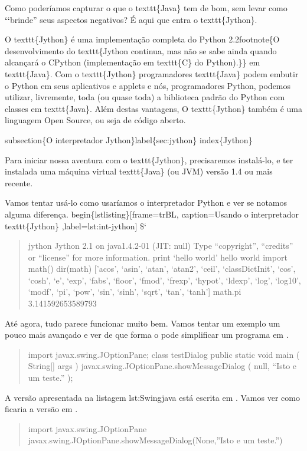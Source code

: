 \documentclass[a4paper,10pt,portuguese]{sphinxmanual}
\begin{document}
Como poderíamos capturar o que o texttt\{Java\} tem de bom, sem levar como {\color{red}\bfseries{}{}`{}`}brinde'' seus aspectos negativos? É aqui que entra o texttt\{Jython\}.

O texttt\{Jython\} é uma implementação completa do Python 2.2footnote\{O desenvolvimento do texttt\{Jython continua, mas não se sabe ainda quando alcançará o CPython (implementação em texttt\{C\} do Python).\}\} em texttt\{Java\}. Com o texttt\{Jython\} programadores texttt\{Java\} podem embutir o Python em seus aplicativos e applets e nós, programadores Python, podemos utilizar, livremente, toda (ou quase toda) a biblioteca padrão do Python com classes em texttt\{Java\}. Além destas vantagens, O texttt\{Jython\} também é uma linguagem Open Source, ou seja de código aberto.

subsection\{O interpretador Jython\}label\{sec:jython\}
index\{Jython\}

Para iniciar nossa aventura com o texttt\{Jython\}, precisaremos instalá-lo, e ter instalada uma máquina virtual texttt\{Java\} (ou JVM)  versão 1.4 ou mais recente.

Vamos tentar usá-lo como usaríamos o interpretador Python e ver se notamos alguma diferença.
begin\{lstlisting\}{[}frame=trBL, caption=Usando o interpretador texttt\{Jython\} ,label=lst:int-jython{]}
\${}`
\begin{quote}

jython Jython 2.1 on java1.4.2-01 (JIT: null) Type ``copyright'',
``credits'' or ``license'' for more information. print `hello world'
hello world import math() dir(math) {[}'acos', `asin', `atan',
`atan2', `ceil', `classDictInit', `cos', `cosh', `e', `exp',
`fabs', `floor', `fmod', `frexp', `hypot', `ldexp', `log', `log10',
`modf', `pi', `pow', `sin', `sinh', `sqrt', `tan', `tanh'{]} math.pi
3.141592653589793
\end{quote}

Até agora, tudo parece funcionar muito bem. Vamos tentar um exemplo
um pouco mais avançado e ver de que forma o  pode
simplificar um programa em .
\begin{quote}

import javax.swing.JOptionPane; class testDialog public static void
main ( String{[}{]} args ) javax.swing.JOptionPane.showMessageDialog (
null, ``Isto e um teste.'' );
\end{quote}

A versão apresentada na listagem lst:Swingjava está escrita em
. Vamos ver como ficaria a versão em .
\begin{quote}

import javax.swing.JOptionPane
javax.swing.JOptionPane.showMessageDialog(None,''Isto e um
teste.'')
\end{quote}
\end{document}
